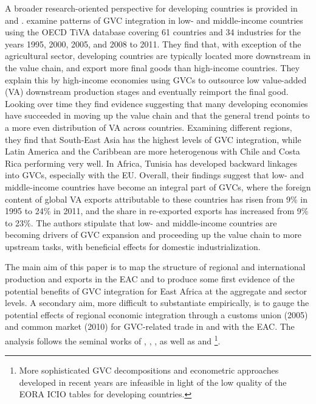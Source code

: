 \documentclass[a4paper]{article}
\begin{document}
A broader research-oriented perspective for developing countries is provided in \citet{Kummritz20162} and \citet{Kummritz20161}. \citet{Kummritz20162} examine patterns of GVC integration in low- and middle-income countries using the OECD TiVA database covering 61 countries and 34 industries for the years 1995, 2000, 2005, and 2008 to 2011. They find that, with exception of the agricultural sector, developing countries are typically located more downstream in the value chain, and export more final goods than high-income countries. They explain this by high-income economies using GVCs to outsource low value-added (VA) downstream production stages and eventually reimport the final good. Looking over time they find evidence suggesting that many developing economies have succeeded in moving up the value chain and that the general trend points to a more even distribution of VA across countries. Examining different regions, they find that South-East Asia has the highest levels of GVC integration, while Latin America and the Caribbean are more heterogenous with Chile and Costa Rica performing very well. In Africa, Tunisia has developed backward linkages into GVCs, especially with the EU. Overall, their findings suggest that low- and middle-income countries have become an integral part of GVCs, where the foreign content of global VA exports attributable to these countries has risen from 9\% in 1995 to 24\% in 2011, and the share in re-exported exports has increased from 9\% to 23\%. The authors stipulate that low- and middle-income countries are becoming drivers of GVC expansion and proceeding up the value chain to more upstream tasks, with beneficial effects for domestic industrialization. \newline

The main aim of this paper is to map the structure of regional and international production and exports in the EAC and to produce some first evidence of the potential benefits of GVC integration for East Africa at the aggregate and sector levels. A secondary aim, more difficult to substantiate empirically, is to gauge the potential effects of regional economic integration through a customs union (2005) and common market (2010) for GVC-related trade in and with the EAC. The analysis follows the seminal works of \citet{hummels2001nature}, \citet{koopman2014tracing}, \citet{wang2013quantifying}, as well as \citet{Kummritz20161} and \citet{Kummritz20162}\footnote{More sophisticated GVC decompositions and econometric approaches developed in recent years are infeasible in light of the low quality of the EORA ICIO tables for developing countries.}. 
\end{document}
